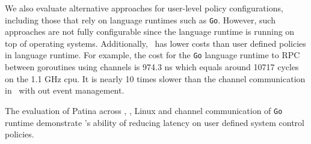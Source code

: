 We also evaluate alternative approaches for user-level policy configurations, including those that rely on language runtimes such as {\tt Go}.
However, such approaches are not fully configurable since the language runtime is running on top of operating systems.
Additionally, \name\ has lower costs than user defined policies in language runtime.
For example, the cost for the {\tt Go} language runtime to RPC between goroutines using channels is 974.3 ns which equals around 10717 cycles on the 1.1 GHz cpu.
It is nearly 10 times slower than the channel communication in \name\ with out event management.


The evaluation of Patina across \cos , \name , Linux and channel communication of {\tt Go} runtime demonstrate \name 's ability of reducing latency on user defined system control policies.






